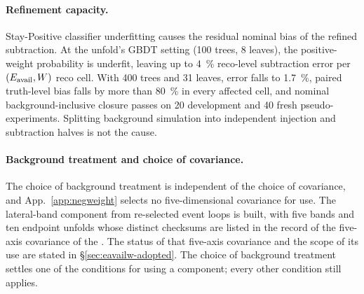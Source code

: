\paragraph{Refinement capacity.} Stay-Positive classifier underfitting causes the residual nominal bias of the refined subtraction. At the unfold's GBDT setting (100 trees, 8 leaves), the positive-weight probability is underfit, leaving up to \SI{4}{\percent} reco-level subtraction error per $(E_{\mathrm{avail}},W)$ reco cell. With 400 trees and 31 leaves, error falls to \SI{1.7}{\percent}, paired truth-level bias falls by more than \SI{80}{\percent} in every affected cell, and nominal background-inclusive closure passes on 20 development and 40 fresh pseudo-experiments. Splitting background simulation into independent injection and subtraction halves is not the cause.

\paragraph{Background treatment and choice of covariance.} The choice of background treatment is independent of the choice of covariance, and App.~\ref{app:negweight} selects no five-dimensional covariance for use. The lateral-band component from re-selected event loops is built, with five bands and ten endpoint unfolds whose distinct checksums are listed in the record of the five-axis covariance of the \resFiveAxis{}. The status of that five-axis covariance and the scope of its use are stated in \S\ref{sec:eavailw-adopted}. The choice of background treatment settles one of the conditions for using a component; every other condition still applies.
